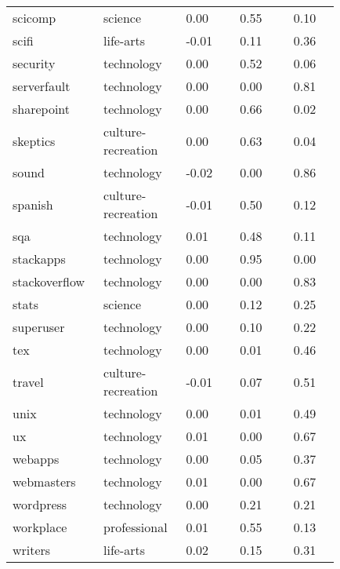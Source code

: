 \begin{longtabu}{@{}
	p{0.2\linewidth}
	p{0.2\linewidth}
	P{0.15\linewidth}
	P{0.15\linewidth}
	P{0.13\linewidth}@{}}
scicomp          & science            & 0.00        & 0.55          & 0.10           \\
scifi            & life-arts          & -0.01       & 0.11          & 0.36           \\
security         & technology         & 0.00        & 0.52          & 0.06           \\
serverfault      & technology         & 0.00        & 0.00          & 0.81           \\
sharepoint       & technology         & 0.00        & 0.66          & 0.02           \\
skeptics         & culture-recreation & 0.00        & 0.63          & 0.04           \\
sound            & technology         & -0.02       & 0.00          & 0.86           \\
spanish          & culture-recreation & -0.01       & 0.50          & 0.12           \\
sqa              & technology         & 0.01        & 0.48          & 0.11           \\
stackapps        & technology         & 0.00        & 0.95          & 0.00           \\
stackoverflow    & technology         & 0.00        & 0.00          & 0.83           \\
stats            & science            & 0.00        & 0.12          & 0.25           \\
superuser        & technology         & 0.00        & 0.10          & 0.22           \\
tex              & technology         & 0.00        & 0.01          & 0.46           \\
travel           & culture-recreation & -0.01       & 0.07          & 0.51           \\
unix             & technology         & 0.00        & 0.01          & 0.49           \\
ux               & technology         & 0.01        & 0.00          & 0.67           \\
webapps          & technology         & 0.00        & 0.05          & 0.37           \\
webmasters       & technology         & 0.01        & 0.00          & 0.67           \\
wordpress        & technology         & 0.00        & 0.21          & 0.21           \\
workplace        & professional       & 0.01        & 0.55          & 0.13           \\
writers          & life-arts          & 0.02        & 0.15          & 0.31           \\ \bottomrule


\end{longtabu}
